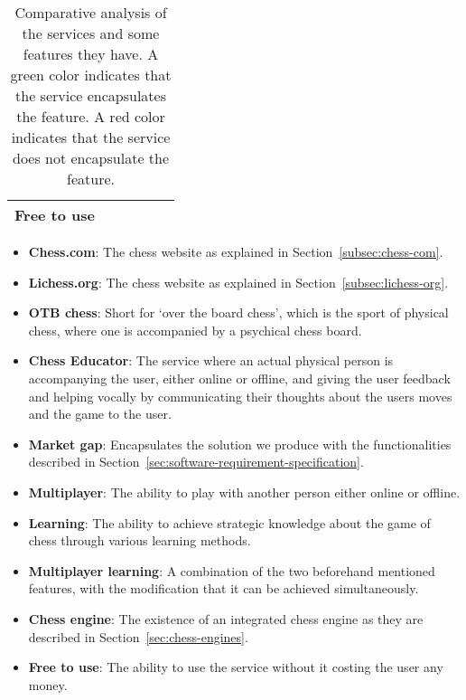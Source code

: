 \begin{table}[H]
{\begin{tabular}{clllll}
            \cellcolor[HTML]{EFEFEF}\textbf{Free to use} &
            \multicolumn{1}{l}{\cellcolor[HTML]{67FD9A}} &
            \multicolumn{1}{l}{\cellcolor[HTML]{67FD9A}} &
            \multicolumn{1}{l}{\cellcolor[HTML]{67FD9A}} &
            \multicolumn{1}{l}{\cellcolor[HTML]{FD6864}} &
            \\ \bottomrule
        \end{tabular}%
    }
    \caption{Comparative analysis of the services and some features they have.
    A green color indicates that the service encapsulates the feature.
    A red color indicates that the service does not encapsulate the feature.}\label{tab:comparative-analysis}
\end{table}

\begin{itemize}
    \item \textbf{{Chess.com}}: The chess website as explained in Section~\ref{subsec:chess-com}.
    \item \textbf{{Lichess.org}}: The chess website as explained in Section~\ref{subsec:lichess-org}.
    \item \textbf{OTB chess}: Short for `over the board chess',
    which is the sport of physical chess, where one is accompanied by a psychical chess board.
    \item \textbf{Chess Educator}: The service where an actual physical person is accompanying the user, either online
    or offline, and giving the user feedback and helping vocally by communicating their thoughts about the users moves
    and the game to the user.
    \item \textbf{Market gap}: Encapsulates the solution we produce with the functionalities described in
    Section~\ref{sec:software-requirement-specification}.
    \item \textbf{Multiplayer}: The ability to play with another person either online or offline.
    \item \textbf{Learning}: The ability to achieve strategic knowledge about the game of chess through various learning
    methods.
    \item \textbf{Multiplayer learning}: A combination of the two beforehand mentioned features, with the modification
    that it can be achieved simultaneously.
    \item \textbf{Chess engine}: The existence of an integrated chess engine as they are described in
    Section~\ref{sec:chess-engines}.
    \item \textbf{Free to use}: The ability to use the service without it costing the user any money.
\end{itemize}
